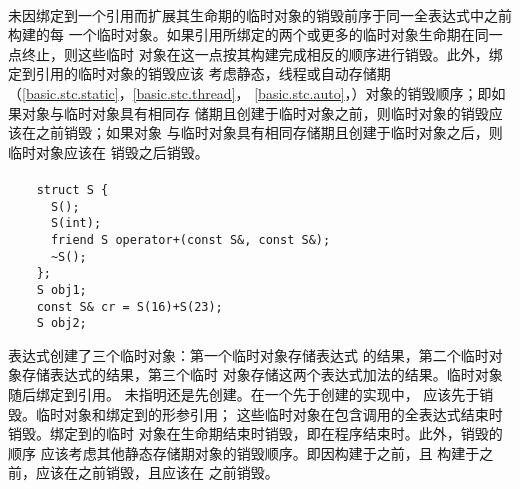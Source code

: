 \paragraph{} %
未因绑定到一个引用而扩展其生命期的临时对象的销毁前序于同一全表达式中之前构建的每
一个临时对象。如果引用所绑定的两个或更多的临时对象生命期在同一点终止，则这些临时
对象在这一点按其构建完成相反的顺序进行销毁。此外，绑定到引用的临时对象的销毁应该
考虑静态，线程或自动存储期（\ref{basic.stc.static}，\ref{basic.stc.thread}，
\ref{basic.stc.auto}，）对象的销毁顺序；即如果对象与临时对象具有相同存
储期且创建于临时对象之前，则临时对象的销毁应该在之前销毁；如果对象
与临时对象具有相同存储期且创建于临时对象之后，则临时对象应该在
销毁之后销毁。

\paragraph{} %
\begin{example}
  \begin{lstlisting}
    struct S {
      S();
      S(int);
      friend S operator+(const S&, const S&);
      ~S();
    };
    S obj1;
    const S& cr = S(16)+S(23);
    S obj2;
  \end{lstlisting}
  表达式创建了三个临时对象：第一个临时对象存储表达式
  的结果，第二个临时对象存储表达式的结果，第三个临时
  对象存储这两个表达式加法的结果。临时对象随后绑定到引用。
  未指明还是先创建。在一个先于创建的实现中，
  应该先于销毁。临时对象和绑定到的形参引用；
  这些临时对象在包含调用的全表达式结束时销毁。绑定到的临时
  对象在生命期结束时销毁，即在程序结束时。此外，销毁的顺序
  应该考虑其他静态存储期对象的销毁顺序。即因构建于之前，且
  构建于之前，应该在之前销毁，且应该在
  之前销毁。
\end{example}
